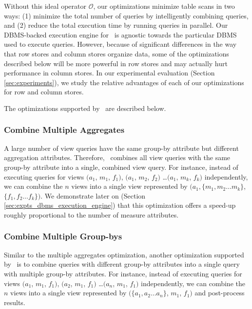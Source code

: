 Without this ideal operator $\mathcal{O}$,
our optimizations minimize table scans in two ways: (1) minimize the total number of
queries by intelligently combining queries, and (2) reduce the total
execution time by running queries in parallel. 
Our DBMS-backed execution engine for \VizRecDB\ is agnostic towards the
particular DBMS used to execute queries.
However, because of significant differences in the way that row stores and
column stores organize data, some of the optimizations described below
will be more powerful in row stores and may actually hurt performance in column
stores. In our experimental evaluation (Section \ref{sec:experiments}), we study
the relative advantages of each of our optimizations for row and column stores.

The optimizations supported by \VizRecDB\ are described below.

\subsubsection {Combine Multiple Aggregates} 
A large number of view queries have the same group-by attribute but different
aggregation attributes. 
Therefore, \VizRecDB\ combines all view queries with the same
group-by attribute into a single, combined view query. For instance, instead of executing
queries for views $(a_1$, $m_1$, $f_1)$, $(a_1$, $m_2$, $f_2)$ \ldots $(a_1$, $m_k$, $f_k)$
independently, we can combine the $n$ views into a single view represented by
$(a_1, \{m_1, m_2\ldots m_k\}$, $\{f_1, f_2\ldots f_k\})$. We demonstrate later
on (Section \ref{sec:expts_dbms_execution_engine})  that this optimization
offers a speed-up roughly proportional to the number of measure attributes.

\subsubsection {Combine Multiple Group-bys}
\label{subsec:mult_gb}
  Similar to the multiple aggregates optimization, another optimization
  supported by \VizRecDB\ is to combine queries with different group-by attributes
  into a single query with multiple group-by attributes.
  For instance, instead of executing queries for views $(a_1$, $m_1$, $f_1)$,
  $(a_2$, $m_1$, $f_1)$ \ldots $(a_n$, $m_1$, $f_1)$ independently, we can
  combine the $n$ views into a single view represented by $(\{a_1, a_2\ldots
  a_n\}$, $m_1$, $f_1)$ and post-process results.

